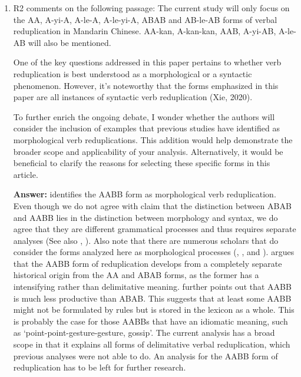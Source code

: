 \documentclass[fleqn,twoside]{article}
\begin{document}
\begin{enumerate}
\item
R2 comments on the following passage: The current study will only focus on the AA, A-yi-A, A-le-A, A-le-yi-A, ABAB and
AB-le-AB forms of verbal reduplication in Mandarin Chinese. AA-kan, A-kan-kan,
AAB, A-yi-AB, A-le-AB will also be mentioned.

One of the key questions addressed in this paper pertains to whether verb reduplication is best understood as a morphological or a syntactic phenomenon. However, it's noteworthy that the forms emphasized in this paper are all instances of syntactic verb reduplication (Xie, 2020).

To further enrich the ongoing debate, I wonder whether the authors will consider the inclusion of examples that previous studies have identified as morphological verb reduplications. This addition would help demonstrate the broader scope and applicability of your analysis. Alternatively, it would be beneficial to clarify the reasons for selecting these specific forms in this article.

\noindent
\textbf{Answer:}
\citet{Xie2020} identifies the AABB form as morphological verb reduplication.
Even though we do not agree with  claim that the distinction between ABAB and AABB lies in the distinction between morphology and syntax,
we do agree that they are different grammatical processes and thus requires separate analyses (See also \citealt[Sec. 4.3]{Deng2013}, \citealt{Wang2023}).
Also note that there are numerous scholars that do consider the forms analyzed here as morphological processes (\citealt[Ch. 4]{Chao1968}, \citealt[Ch. 3]{LiThompson1981}, \citealt[4--5]{Liao2014} and \citealt[Sec. 4]{Sui2018}).
\citet[14--15]{Zhang2000} argues that the AABB form of reduplication develops from a completely separate historical origin from the AA and ABAB forms,
as the former has a intensifying rather than delimitative meaning.
\citet[83--84]{Xie2020} further points out that AABB is much less productive than ABAB.
This suggests that at least some AABB might not be formulated by rules but is stored in the lexicon as a whole.
This is probably the case for those AABBs that have an idiomatic meaning, such as  `point-point-gesture-gesture, gossip'.
The current analysis has a broad scope in that it explains all forms of delimitative verbal reduplication, which previous analyses were not able to do.
An analysis for the AABB form of reduplication has to be left for further research.


\end{enumerate}
\end{document}
